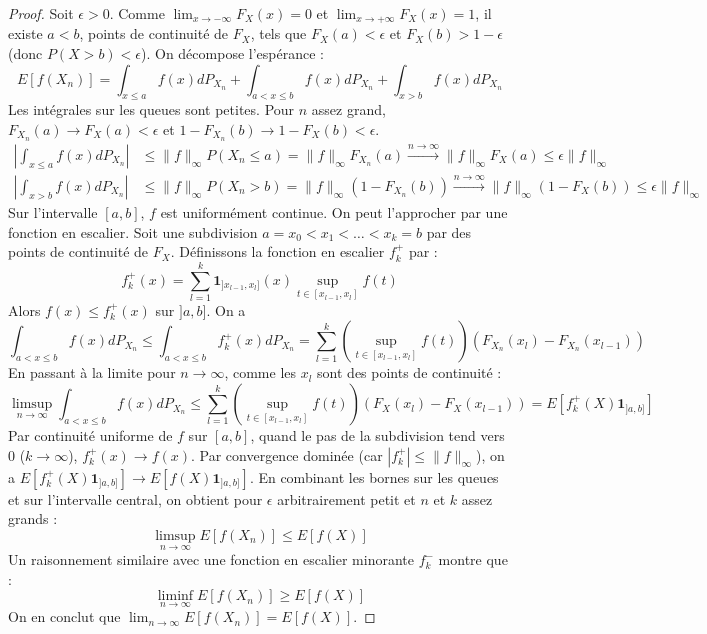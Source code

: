 \begin{proof}
Soit $\epsilon > 0$. Comme $\lim_{x \to -\infty} F_X(x) = 0$ et $\lim_{x \to +\infty} F_X(x) = 1$, il existe $a < b$, points de continuité de $F_X$, tels que $F_X(a) < \epsilon$ et $F_X(b) > 1-\epsilon$ (donc $P(X>b) < \epsilon$).
On décompose l'espérance :
\[ E[f(X_n)] = \int_{x \le a} f(x) dP_{X_n} + \int_{a < x \le b} f(x) dP_{X_n} + \int_{x > b} f(x) dP_{X_n} \]
Les intégrales sur les queues sont petites. Pour $n$ assez grand, $F_{X_n}(a) \to F_X(a) < \epsilon$ et $1-F_{X_n}(b) \to 1-F_X(b) < \epsilon$.
\begin{align*}
    \left| \int_{x \le a} f(x) dP_{X_n} \right| &\le \|f\|_\infty P(X_n \le a) = \|f\|_\infty F_{X_n}(a) \xrightarrow{n \to \infty} \|f\|_\infty F_X(a) \le \epsilon \|f\|_\infty \\
    \left| \int_{x > b} f(x) dP_{X_n} \right| &\le \|f\|_\infty P(X_n > b) = \|f\|_\infty (1-F_{X_n}(b)) \xrightarrow{n \to \infty} \|f\|_\infty (1-F_X(b)) \le \epsilon \|f\|_\infty
\end{align*}
Sur l'intervalle $[a,b]$, $f$ est uniformément continue. On peut l'approcher par une fonction en escalier. Soit une subdivision $a=x_0 < x_1 < \dots < x_k = b$ par des points de continuité de $F_X$. Définissons la fonction en escalier $f_k^+$ par :
\[ f_k^+(x) = \sum_{l=1}^k \mathbf{1}_{]x_{l-1}, x_l]}(x) \sup_{t \in [x_{l-1}, x_l]} f(t) \]
Alors $f(x) \le f_k^+(x)$ sur $]a,b]$. On a
\[ \int_{a < x \le b} f(x) dP_{X_n} \le \int_{a < x \le b} f_k^+(x) dP_{X_n} = \sum_{l=1}^k \left( \sup_{t \in [x_{l-1}, x_l]} f(t) \right) (F_{X_n}(x_l) - F_{X_n}(x_{l-1})) \]
En passant à la limite pour $n \to \infty$, comme les $x_l$ sont des points de continuité :
\[ \limsup_{n \to \infty} \int_{a < x \le b} f(x) dP_{X_n} \le \sum_{l=1}^k \left( \sup_{t \in [x_{l-1}, x_l]} f(t) \right) (F_{X}(x_l) - F_{X}(x_{l-1})) = E[f_k^+(X)\mathbf{1}_{]a,b]}] \]
Par continuité uniforme de $f$ sur $[a,b]$, quand le pas de la subdivision tend vers 0 ($k \to \infty$), $f_k^+(x) \to f(x)$. Par convergence dominée (car $|f_k^+| \le \|f\|_\infty$), on a $E[f_k^+(X)\mathbf{1}_{]a,b]}] \to E[f(X)\mathbf{1}_{]a,b]}]$.
En combinant les bornes sur les queues et sur l'intervalle central, on obtient pour $\epsilon$ arbitrairement petit et $n$ et $k$ assez grands :
\[ \limsup_{n \to \infty} E[f(X_n)] \le E[f(X)] \]
Un raisonnement similaire avec une fonction en escalier minorante $f_k^-$ montre que :
\[ \liminf_{n \to \infty} E[f(X_n)] \ge E[f(X)] \]
On en conclut que $\lim_{n \to \infty} E[f(X_n)] = E[f(X)]$.
\end{proof}
